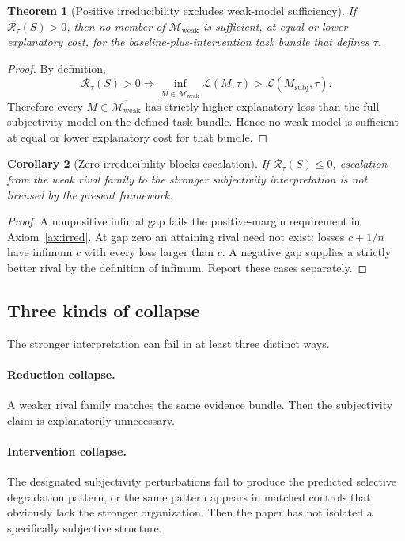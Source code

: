 \documentclass[11pt,a4paper]{article}
\newtheorem{theorem}{Theorem}[section]
\newtheorem{corollary}[theorem]{Corollary}
\theoremstyle{definition}
\newcommand{\WeakFam}{\mathcal{M}_{\mathrm{weak}}}
\newcommand{\WeakClosure}{\overline{\WeakFam}}
\newcommand{\Irred}{\mathcal{R}}
\newcommand{\Loss}{\mathcal{L}}
\begin{document}
\begin{theorem}[Positive irreducibility excludes weak-model sufficiency]
If $\Irred_\tau(S)>0$, then no member of $\WeakClosure$ is sufficient, at equal or lower explanatory cost, for the baseline-plus-intervention task bundle that defines $\tau$.
\end{theorem}

\begin{proof}
By definition,
\[
\Irred_\tau(S)>0 \Longrightarrow \inf_{M\in\WeakClosure}\Loss(M,\tau)>\Loss(M_{\mathrm{subj}},\tau).
\]
Therefore every $M\in\WeakClosure$ has strictly higher explanatory loss than the full subjectivity model on the defined task bundle. Hence no weak model is sufficient at equal or lower explanatory cost for that bundle.
\end{proof}

\begin{corollary}[Zero irreducibility blocks escalation]\label{cor:zero-irred}
If $\Irred_\tau(S)\le 0$, escalation from the weak rival family to the stronger subjectivity interpretation is not licensed by the present framework.
\end{corollary}

\begin{proof}
A nonpositive infimal gap fails the positive-margin requirement in Axiom~\ref{ax:irred}. At gap zero an attaining rival need not exist: losses $c+1/n$ have infimum $c$ with every loss larger than $c$. A negative gap supplies a strictly better rival by the definition of infimum. Report these cases separately.
\end{proof}

\subsection{Three kinds of collapse}
The stronger interpretation can fail in at least three distinct ways.

\paragraph{Reduction collapse.} A weaker rival family matches the same evidence bundle. Then the subjectivity claim is explanatorily unnecessary.

\paragraph{Intervention collapse.} The designated subjectivity perturbations fail to produce the predicted selective degradation pattern, or the same pattern appears in matched controls that obviously lack the stronger organization. Then the paper has not isolated a specifically subjective structure.
\end{document}
